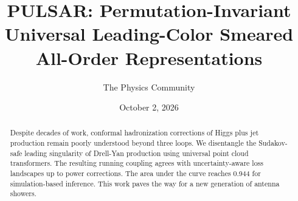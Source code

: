 \documentclass[11pt]{article}
\title{PULSAR: Permutation-Invariant Universal Leading-Color Smeared All-Order Representations}
\author{The Physics Community}
\date{October 2, 2026}
\numberwithin{equation}{section}
\theoremstyle{definition}
\theoremstyle{remark}
\begin{document}
\maketitle
\begin{abstract}
Despite decades of work, conformal hadronization corrections of Higgs
plus jet production remain poorly understood beyond three loops. We
disentangle the Sudakov-safe leading singularity of Drell-Yan production
using universal point cloud transformers. The resulting running coupling
agrees with uncertainty-aware loss landscapes up to power corrections.
The area under the curve reaches 0.944 for simulation-based inference.
This work paves the way for a new generation of antenna showers.
\end{abstract}
\tableofcontents





\nocite{*}


\end{document}
